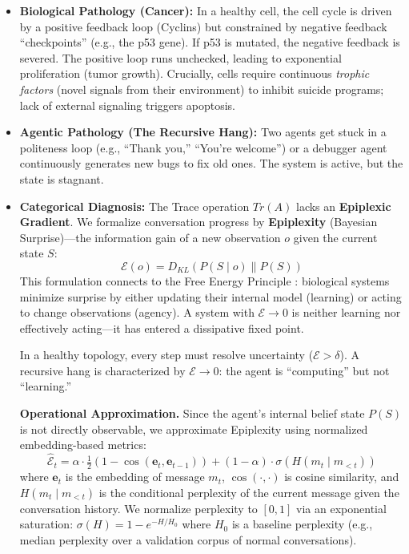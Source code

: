 \begin{itemize}[leftmargin=*]
\item \textbf{Biological Pathology (Cancer):} In a healthy cell, the cell cycle is driven by a positive feedback
loop (Cyclins) but constrained by negative feedback ``checkpoints'' (e.g., the p53 gene). If p53 is mutated,
the negative feedback is severed. The positive loop runs unchecked, leading to exponential proliferation
(tumor growth). Crucially, cells require continuous \textit{trophic factors} (novel signals from their
environment) to inhibit suicide programs; lack of external signaling triggers apoptosis.
\item \textbf{Agentic Pathology (The Recursive Hang):} Two agents get stuck in a politeness loop (e.g.,
``Thank you,'' ``You're welcome'') or a debugger agent continuously generates new bugs to fix old ones.
The system is active, but the state is stagnant.
\item \textbf{Categorical Diagnosis:} The Trace operation $Tr(A)$ lacks an \textbf{Epiplexic Gradient}. We
formalize conversation progress by \textbf{Epiplexity} (Bayesian Surprise)---the information gain of a new
observation $o$ given the current state $S$:
\begin{equation}
\mathcal{E}(o) = D_{KL}( P(S \mid o) \| P(S) )
\label{eq:epiplexity-kl}
\end{equation}
This formulation connects to the Free Energy Principle \cite{friston2010}: biological systems minimize
surprise by either updating their internal model (learning) or acting to change observations (agency).
A system with $\mathcal{E} \to 0$ is neither learning nor effectively acting---it has entered a
dissipative fixed point.

In a healthy topology, every step must resolve uncertainty ($\mathcal{E} > \delta$). A recursive hang is
characterized by $\mathcal{E} \to 0$: the agent is ``computing'' but not ``learning.''

\textbf{Operational Approximation.} Since the agent's internal belief state $P(S)$ is not directly
observable, we approximate Epiplexity using normalized embedding-based metrics:
\begin{equation}
\hat{\mathcal{E}}_t = \alpha \cdot \tfrac{1}{2}(1 - \cos(\mathbf{e}_{t}, \mathbf{e}_{t-1})) + (1 - \alpha) \cdot \sigma(H(m_t \mid m_{<t}))
\label{eq:epiplexity-approx}
\end{equation}
where $\mathbf{e}_t$ is the embedding of message $m_t$, $\cos(\cdot, \cdot)$ is cosine similarity, and
$H(m_t \mid m_{<t})$ is the conditional perplexity of the current message given the conversation history.
We normalize perplexity to $[0,1]$ via an exponential saturation: $\sigma(H) = 1 - e^{-H/H_0}$ where $H_0$ is a baseline
perplexity (e.g., median perplexity over a validation corpus of normal conversations).


\end{itemize}
